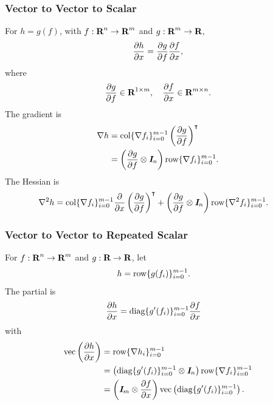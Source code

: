 \documentclass{article}
\begin{document}
        \subsubsection{Vector to Vector to Scalar}
        For $h=g(f)$, with $f:\textbf{R}^n\to\textbf{R}^m$ and $g:\textbf{R}^m\to\textbf{R}$,
        \begin{align*}
            \frac{\partial h}{\partial x}=\frac{\partial g}{\partial f}\frac{\partial f}{\partial x},
        \end{align*}
        where 
        \begin{align*}
            \frac{\partial g}{\partial f}\in\textbf{R}^{1\times m}, \quad 
            \frac{\partial f}{\partial x}\in\textbf{R}^{m\times n}.
        \end{align*}
        The gradient is
        \begin{align*}
            \nabla h
            &
            =\text{col}\{\nabla f_i\}_{i=0}^{m-1} \left(\frac{\partial g}{\partial f}\right)^\intercal
            \\
            &
            =\left(\frac{\partial g}{\partial f}\otimes \emph{\textbf{I}}_n\right)\text{row}\{\nabla f_i\}_{i=0}^{m-1}.
        \end{align*}
        The Hessian is
        \begin{align*}
            \nabla^2 h
            &=\text{col}\{\nabla f_i\}_{i=0}^{m-1}\frac{\partial }{\partial x}\left(\frac{\partial g}{\partial f}\right)^\intercal
            +\left(\frac{\partial g}{\partial f}\otimes \emph{\textbf{I}}_n\right)\text{row}\{\nabla^2 f_i\}_{i=0}^{m-1}.
        \end{align*}
    
    \subsubsection{Vector to Vector to Repeated Scalar}
        For $f:\textbf{R}^n\to\textbf{R}^m$ and $g:\textbf{R}\to\textbf{R}$, let
        \begin{align*}
            h&=\text{row}\{g(f_i)\}_{i=0}^{m-1}.
        \end{align*}
        The partial is
        \begin{align*}
            \frac{\partial h}{\partial x}&=\text{diag}\{g'(f_i)\}_{i=0}^{m-1}\frac{\partial f}{\partial x}
        \end{align*}
        with
        \begin{align*}
            \mathrm{vec}\left(\frac{\partial h}{\partial x}\right)&=\text{row}\{\nabla h_i\}_{i=0}^{m-1}\\
            &=\left(\text{diag}\{g'(f_i)\}_{i=0}^{m-1}\otimes \emph{\textbf{I}}_n\right)\text{row}\{\nabla f_i\}_{i=0}^{m-1}\\
            &=\left(\emph{\textbf{I}}_m\otimes\frac{\partial f}{\partial x}\right)\mathrm{vec}\left(\text{diag}\{g'(f_i)\}_{i=0}^{m-1}\right).
        \end{align*}
    
\end{document}
